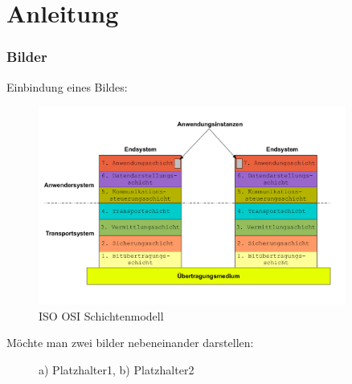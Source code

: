 \chapter{Anleitung}

\subsection{Bilder}

Einbindung eines Bildes:
\begin{figure}[ht]
	\begin{center}
		\includegraphics[width=0.9\textwidth]{./Bilder-Screenshots/ISO_OSI_Schichtenmodell.pdf}
		\caption{ISO OSI Schichtenmodell \cite{Deadlyhappen2014}}
		\label{OsiIsoModell}
	\end{center}
\end{figure}

Möchte man zwei bilder nebeneinander darstellen:
\begin{figure}[H]
	\centering
	\qquad

	\caption{a) Platzhalter1, b) Platzhalter2}
	\label{fig:ZweiBilder}
\end{figure}
